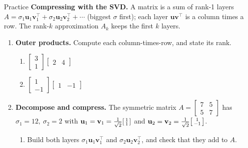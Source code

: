 \documentclass[10pt]{article}
\newcommand{\uu}{\mathbf{u}}
\newcommand{\vv}{\mathbf{v}}
\newcommand{\T}{^{\top}}
\begin{document}
\namedateperiod

\vspace{0.12in}

\begin{notesbox}{Practice}
\textbf{Compressing with the SVD.} A matrix is a sum of rank-1 layers
$A=\sigma_1\uu_1\vv_1\T+\sigma_2\uu_2\vv_2\T+\cdots$ (biggest $\sigma$ first); each layer $\uu\vv\T$ is a
column times a row. The rank-$k$ approximation $A_k$ keeps the first $k$ layers.

\begin{enumerate}[leftmargin=1.9em, itemsep=12pt]
  \item \textbf{Outer products.} Compute each column-times-row, and state its rank.
    \begin{enumerate}[label=(\alph*), leftmargin=1.8em, itemsep=3pt]
      \item $\begin{bmatrix} 3\\1 \end{bmatrix}\begin{bmatrix} 2 & 4 \end{bmatrix}$
      \item $\begin{bmatrix} 1\\-1 \end{bmatrix}\begin{bmatrix} 1 & -1 \end{bmatrix}$
    \end{enumerate}
    \vspace{1.6cm}
  \item \textbf{Decompose and compress.} The symmetric matrix $A=\begin{bmatrix} 7 & 5\\ 5 & 7 \end{bmatrix}$
        has $\sigma_1=12,\ \sigma_2=2$ with $\uu_1=\vv_1=\tfrac1{\sqrt2}\begin{bsmallmatrix} 1\\1 \end{bsmallmatrix}$
        and $\uu_2=\vv_2=\tfrac1{\sqrt2}\begin{bsmallmatrix} 1\\-1 \end{bsmallmatrix}$.
    \begin{enumerate}[label=(\alph*), leftmargin=1.8em, itemsep=3pt]
      \item Build both layers $\sigma_1\uu_1\vv_1\T$ and $\sigma_2\uu_2\vv_2\T$, and check that they add to $A$.

\end{enumerate}
\end{enumerate}
\end{notesbox}
\end{document}
